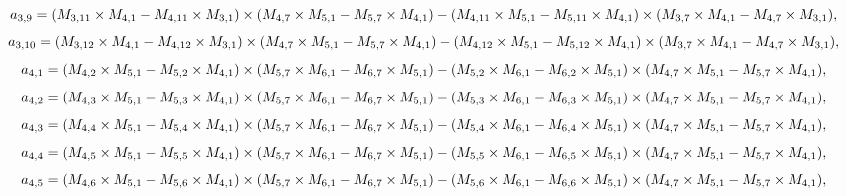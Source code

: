 \documentclass[10pt]{asme2ej}
\begin{document}
\begin{landscape}
\begin{equation}
\end{equation}
\begin{equation}
    a_{3,9} = (M_{3,11}\times M_{4,1}-M_{4,11}\times M_{3,1})\times (M_{4,7}\times M_{5,1}-M_{5,7}\times M_{4,1})\\-(M_{4,11}\times M_{5,1}-M_{5,11}\times M_{4,1})\times (M_{3,7}\times M_{4,1}-M_{4,7}\times M_{3,1}),
\end{equation}
\begin{equation}
    a_{3,10} = (M_{3,12}\times M_{4,1}-M_{4,12}\times M_{3,1})\times (M_{4,7}\times M_{5,1}-M_{5,7}\times M_{4,1})\\-(M_{4,12}\times M_{5,1}-M_{5,12}\times M_{4,1})\times (M_{3,7}\times M_{4,1}-M_{4,7}\times M_{3,1}),
\end{equation}
\begin{equation}
    a_{4,1} = (M_{4,2}\times M_{5,1}-M_{5,2}\times M_{4,1})\times (M_{5,7}\times M_{6,1}-M_{6,7}\times M_{5,1})\\-(M_{5,2}\times M_{6,1}-M_{6,2}\times M_{5,1})\times (M_{4,7}\times M_{5,1}-M_{5,7}\times M_{4,1}),
\end{equation}
\begin{equation}
    a_{4,2} = (M_{4,3}\times M_{5,1}-M_{5,3}\times M_{4,1})\times (M_{5,7}\times M_{6,1}-M_{6,7}\times M_{5,1})\\-(M_{5,3}\times M_{6,1}-M_{6,3}\times M_{5,1})\times (M_{4,7}\times M_{5,1}-M_{5,7}\times M_{4,1}),
\end{equation}
\begin{equation}
    a_{4,3} = (M_{4,4}\times M_{5,1}-M_{5,4}\times M_{4,1})\times (M_{5,7}\times M_{6,1}-M_{6,7}\times M_{5,1})\\-(M_{5,4}\times M_{6,1}-M_{6,4}\times M_{5,1})\times (M_{4,7}\times M_{5,1}-M_{5,7}\times M_{4,1}),
\end{equation}
\begin{equation}
    a_{4,4} = (M_{4,5}\times M_{5,1}-M_{5,5}\times M_{4,1})\times (M_{5,7}\times M_{6,1}-M_{6,7}\times M_{5,1})\\-(M_{5,5}\times M_{6,1}-M_{6,5}\times M_{5,1})\times (M_{4,7}\times M_{5,1}-M_{5,7}\times M_{4,1}),
\end{equation}
\begin{equation}
    a_{4,5} = (M_{4,6}\times M_{5,1}-M_{5,6}\times M_{4,1})\times (M_{5,7}\times M_{6,1}-M_{6,7}\times M_{5,1})\\-(M_{5,6}\times M_{6,1}-M_{6,6}\times M_{5,1})\times (M_{4,7}\times M_{5,1}-M_{5,7}\times M_{4,1}),
\end{equation}

\end{landscape}
\end{document}
